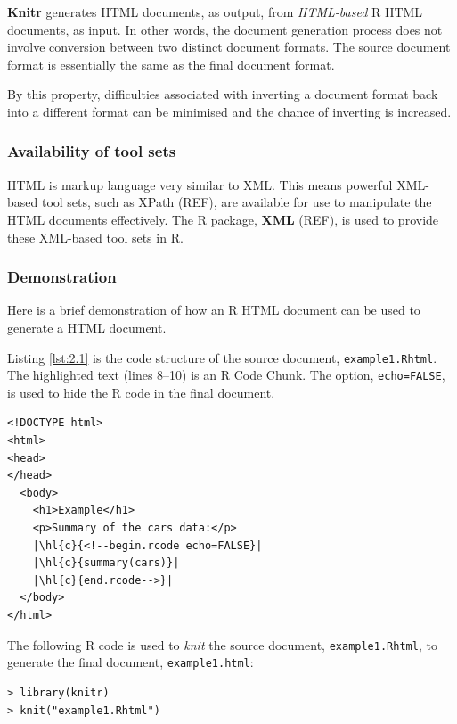 \documentclass[a4paper, 12pt]{report}
\begin{document}
\textbf{Knitr} generates HTML documents, as output, from \emph{HTML-based} R HTML documents, as input. In other words, the document generation process does not involve conversion between two distinct document formats. The source document format is essentially the same as the final document format.

By this property, difficulties associated with inverting a document format back into a different format can be minimised and the chance of inverting is increased.

\subsubsection*{Availability of tool sets}
HTML is markup language very similar to XML. This means powerful XML-based tool sets, such as XPath (REF), are available for use to manipulate the HTML documents effectively. The R package, \textbf{XML} (REF), is used to provide these XML-based tool sets in R.

\subsubsection*{Demonstration}
Here is a brief demonstration of how an R HTML document can be used to generate a HTML document.

Listing \ref{lst:2.1} is the code structure of the source document, \texttt{example1.Rhtml}. The highlighted text (lines 8--10) is an R Code Chunk. The option, \texttt{echo=FALSE}, is used to hide the R code in the final document.
\newcommand{\hl}[3][black]{{\fboxsep0.5pt\colorbox{#2}{\color{#1} #3}}}
\begin{lstlisting}[caption={\texttt{example1.Rhtml}}, escapechar=\|, label={lst:2.1}]
<!DOCTYPE html>
<html>
<head>
</head>
  <body>
    <h1>Example</h1>
    <p>Summary of the cars data:</p>
    |\hl{c}{<!--begin.rcode echo=FALSE}|
    |\hl{c}{summary(cars)}|
    |\hl{c}{end.rcode-->}|
  </body>
</html>
\end{lstlisting}

The following R code is used to \emph{knit} the source document, \texttt{example1.Rhtml}, to generate the final document, \texttt{example1.html}:
\begin{lstlisting}[numbers=none, frame=none]
> library(knitr)
> knit("example1.Rhtml")
\end{lstlisting}
\end{document}
